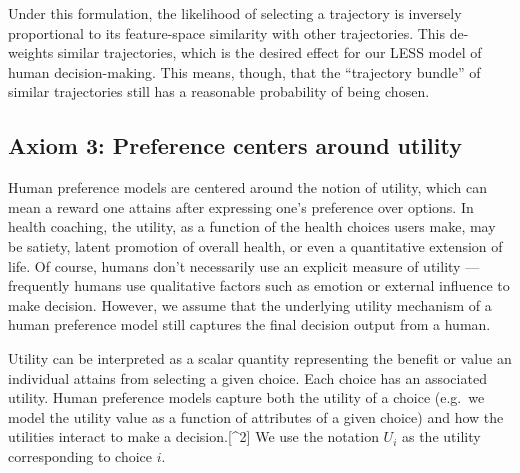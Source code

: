 \documentclass[
  letterpaper,
  DIV=11,
  numbers=noendperiod,
  oneside]{scrreprt}
\theoremstyle{remark}
\begin{document}
Under this formulation, the likelihood of selecting a trajectory is
inversely proportional to its feature-space similarity with other
trajectories. This de-weights similar trajectories, which is the desired
effect for our LESS model of human decision-making. This means, though,
that the ``trajectory bundle'' of similar trajectories still has a
reasonable probability of being chosen.

\subsection*{Axiom 3: Preference centers around
utility}\label{axiom-3-preference-centers-around-utility}

Human preference models are centered around the notion of utility, which
can mean a reward one attains after expressing one's preference over
options. In health
coaching, the utility, as a function of the health choices users make,
may be satiety, latent promotion of overall health, or even a
quantitative extension of life. Of course, humans don't necessarily use
an explicit measure of utility --- frequently humans use qualitative
factors such as emotion or external influence to make decision. However,
we assume that the underlying utility mechanism of a human preference
model still captures the final decision output from a human.

Utility can be interpreted as a scalar quantity representing the benefit
or value an individual attains from selecting a given choice. Each
choice has an associated utility. Human preference models capture both
the utility of a choice (e.g.~we model the utility value as a function
of attributes of a given choice) and how the utilities interact to make
a decision.{[}\^{}2{]} We use the notation \(U_i\) as the utility
corresponding to choice \(i\).
\end{document}
